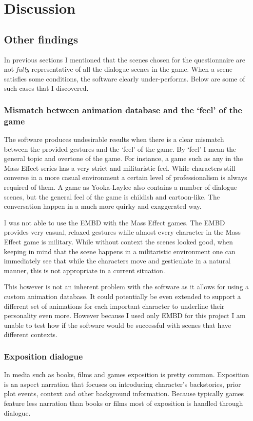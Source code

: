 \chapter{Discussion \label{chap:discussion}}


\section{Other findings \label{sec:otherfindings}}
In previous sections I mentioned that the scenes chosen for the questionnaire are not \textit{fully} representative of all the dialogue scenes in the game. When a scene satisfies some conditions, the software clearly under-performs. Below are some of such cases that I discovered.

\subsection{Mismatch between animation database and the `feel' of the game}
The software produces undesirable results when there is a clear mismatch between the provided gestures and the `feel' of the game. By `feel' I mean the general topic and overtone of the game. For instance, a game such as any in the Mass Effect series has a very strict and militaristic feel. While characters still converse in a more casual environment a certain level of professionalism is always required of them. A game as Yooka-Laylee also contains a number of dialogue scenes, but the general feel of the game is childish and cartoon-like. The conversation happen in a much more quirky and exaggerated way.

I was not able to use the EMBD with the Mass Effect games. The EMBD provides very casual, relaxed gestures while almost every character in the Mass Effect game is military. While without context the scenes looked good, when keeping in mind that the scene happens in a militaristic environment one can immediately see that while the characters move and gesticulate in a natural manner, this is not appropriate in a current situation.

This however is not an inherent problem with the software as it allows for using a custom animation database. It could potentially be even extended to support a different set of animations for each important character to underline their personality even more. However because I used only EMBD for this project I am unable to test how if the software would be successful with scenes that have different contexts.

\subsection{Exposition dialogue}
In media such as books, films and games exposition is pretty common. Exposition is an aspect narration that focuses on introducing character's backstories, prior plot events, context and other background information. Because typically games feature less narration than books or films most of exposition is handled through dialogue.


